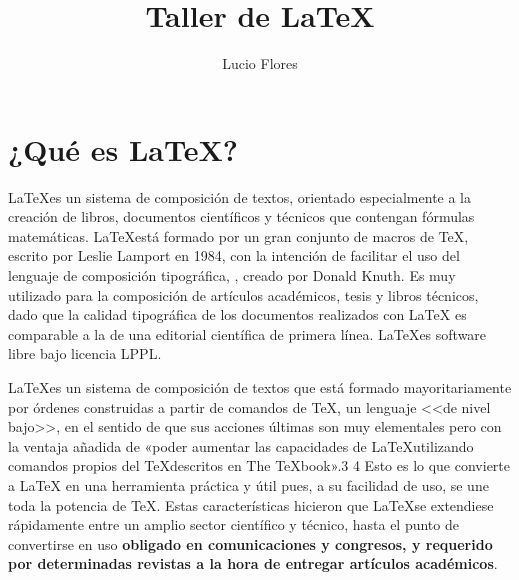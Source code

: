 \documentclass[10pt,a4paper,final,oneside,onecolumn,notitlepage]{article}
\author{Lucio Flores}
\title{Taller de \LaTeX }
\begin{document}
\maketitle
{}


\section{¿Qu\'e es \LaTeX?}{
\LaTeX es un sistema de composición de textos, orientado especialmente a la creación de libros, documentos científicos y técnicos que contengan fórmulas matemáticas. \LaTeX está formado por un gran conjunto de macros de \TeX, escrito por Leslie Lamport en 1984, con la intención de facilitar el uso del lenguaje de composición tipográfica, , creado por Donald Knuth. Es muy utilizado para la composición de artículos académicos, tesis y libros técnicos, dado que la calidad tipográfica de los documentos realizados con LaTeX es comparable a la de una editorial científica de primera línea. \LaTeX es software libre bajo licencia LPPL.

\LaTeX es un sistema de composición de textos que está formado mayoritariamente por órdenes construidas a partir de comandos de \TeX , un lenguaje <<de nivel bajo>>, en el sentido de que sus acciones últimas son muy elementales pero con la ventaja añadida de «poder aumentar las capacidades de \LaTeX utilizando comandos propios del \TeX descritos en The TeXbook».3 4 Esto es lo que convierte a LaTeX en una herramienta práctica y útil pues, a su facilidad de uso, se une toda la potencia de \TeX. Estas características hicieron que \LaTeX se extendiese rápidamente entre un amplio sector científico y técnico, hasta el punto de convertirse en uso \textbf{obligado en comunicaciones y congresos, y requerido por determinadas revistas a la hora de entregar artículos académicos}.

}
\end{document}
